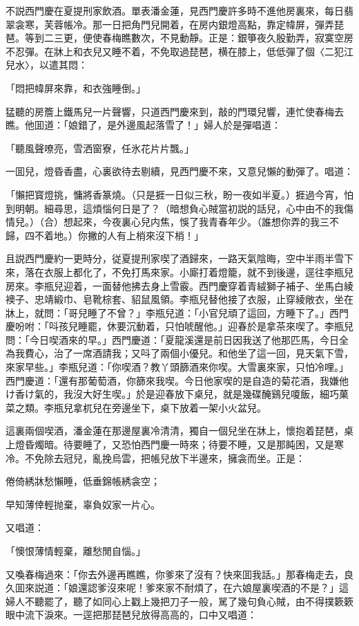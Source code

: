 不説西門慶在夏提刑家飲酒。單表潘金蓮，見西門慶許多時不進他房裏來，每日翡翠衾寒，芙蓉帳冷。那一日把角門兒開着，在房内銀燈高點，靠定幃屏，彈弄琵琶。等到二三更，便使春梅瞧數次，不見動靜。正是：銀箏夜久殷勤弄，寂寞空房不忍彈。在牀上和衣兒又睡不着，不免取過琵琶，横在膝上，低低彈了個〈二犯江兒水〉，以遣其悶：

「悶把幃屏來靠，和衣強睡倒。」

猛聽的房簷上鐵馬兒一片聲響，只道西門慶來到，敲的門環兒響，連忙使春梅去瞧。他囬道：「娘錯了，是外邊風起落雪了！」婦人於是彈唱道：

「聽風聲嘹亮，雪洒窗寮，任氷花片片飄。」

一囬兒，燈昏香盡，心裏欲待去剔續，見西門慶不來，又意兒懶的動彈了。唱道：

「懶把寳燈挑，慵將香篆燒。（只是捱一日似三秋，盼一夜如半夏。）捱過今宵，怕到明朝。細尋思，這煩惱何日是了？（暗想負心賊當初説的話兒，心中由不的我傷情兒。）（合）想起來，今夜裏心兒内焦，悞了我青春年少。（誰想你弄的我三不歸，四不着地。）你撇的人有上梢來沒下梢！」

且説西門慶約一更時分，従夏提刑家喫了酒歸來，一路天氣陰晦，空中半雨半雪下來，落在衣服上都化了，不免打馬來家。小廝打着燈籠，就不到後邊，逕往李瓶兒房來。李瓶兒迎着，一面替他拂去身上雪霰。西門慶穿着青絨獅子補子、坐馬白綾襖子、忠靖緞巾、皂靴棕套、貂鼠風領。李瓶兒替他接了衣服，止穿綾敞衣，坐在牀上，就問：「哥兒睡了不曾？」李瓶兒道：「小官兒頑了這回，方睡下了。」西門慶吩咐：「呌孩兒睡罷，休要沉動着，只怕唬醒他。」迎春於是拿茶來喫了。李瓶兒問：「今日喫酒來的早。」西門慶道：「夏龍溪還是前日因我送了他那匹馬，今日全為我費心，治了一席酒請我；又呌了兩個小優兒。和他坐了這一回，見天氣下雪，來家早些。」李瓶兒道：「你喫酒？教丫頭篩酒來你喫。大雪裏來家，只怕冷哩。」西門慶道：「還有那葡萄酒，你篩來我喫。今日他家喫的是自造的菊花酒，我嫌他け香け氣的，我沒大好生喫。」於是迎春放下桌兒，就是幾碟醃鷄兒嗄飯，細巧菓菜之類。李瓶兒拿杌兒在旁邊坐下，桌下放着一架小火盆兒。

這裏兩個喫酒，潘金蓮在那邊屋裏冷清清，獨自一個兒坐在牀上，懷抱着琵琶，桌上燈昏燭暗。待要睡了，又恐怕西門慶一時來；待要不睡，又是那盹困，又是寒冷。不免除去冠兒，亂挽烏雲，把帳兒放下半邊來，擁衾而坐。正是：

倦倚綉牀愁懶睡，低垂錦帳綉衾空；

早知薄倖輕抛棄，辜負奴家一片心。

又唱道：

「懊恨薄情輕棄，離愁閒自惱。」

又喚春梅過來：「你去外邊再瞧瞧，你爹來了沒有？快來囬我話。」那春梅走去，良久囬來説道：「娘還認爹沒來呢！爹來家不耐煩了，在六娘屋裏喫酒的不是？」這婦人不聽罷了，聽了如同心上戳上幾把刀子一般，駡了幾句負心賊，由不得撲簌簌眼中流下淚來。一逕把那琵琶兒放得高高的，口中又唱道：


